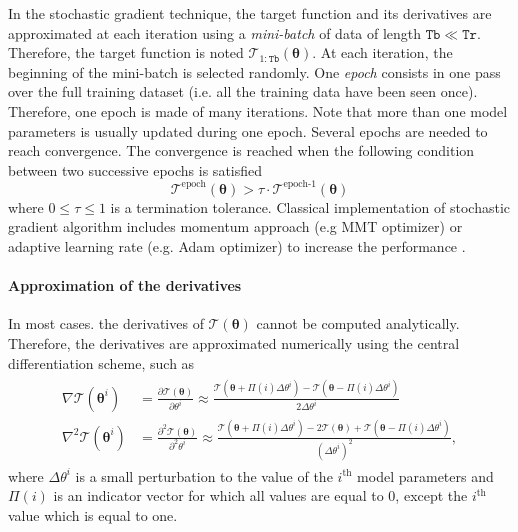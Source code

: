 In the stochastic gradient technique, the target function and its derivatives are approximated at each iteration using a \emph{mini-batch} of data of length $\mathtt{Tb} \ll \mathtt{Tr}$.
Therefore, the target function is noted $\mathcal{T}_{1:\mathtt{Tb}}(\bm{\theta})$.
At each iteration, the beginning of the mini-batch is selected randomly.
One \emph{epoch} consists in one pass over the full training dataset (i.e. all the training data have been seen once).
Therefore, one epoch is made of many iterations.
Note that more than one model parameters is usually updated during one epoch.
Several epochs are needed to reach convergence.
The convergence is reached when the following condition between two successive epochs is satisfied 
\begin{equation}
\mathcal{T}^{\text{epoch}} (\bm\theta) > \tau  \cdot \mathcal{T}^{\text{epoch-1}} (\bm\theta)
\label{EQ:SGT}
\end{equation}
where $0 \le \tau \le 1$ is a termination tolerance.
Classical implementation of stochastic gradient algorithm includes momentum approach (e.g MMT optimizer) or adaptive learning rate (e.g. Adam optimizer) to increase the performance \cite{Goodfellow-et-al-2016}.  

\paragraph{Approximation of the derivatives}

In most cases. the derivatives of $\mathcal{T}(\bm{\theta})$ cannot be computed analytically.
Therefore, the derivatives are approximated numerically using the central differentiation scheme, such as
\begin{gather}
\begin{aligned}
 \nabla \mathcal{T}(\bm\theta^{i}) & = \frac{\partial \mathcal{T} (\bm\theta) }{\partial \theta^{i}} \approx \frac{\mathcal{T} (\bm\theta + \Pi(i)\Delta \theta^{i} )  -  \mathcal{T} (\bm\theta - \Pi(i)\Delta \theta^{i} ) }{2\Delta \theta^{i}}  \\
 \nabla^{2} \mathcal{T}(\bm\theta^{i}) & = \frac{\partial^{2} \mathcal{T} (\bm\theta) }{\partial^{2} \theta^{i}} \approx \frac{\mathcal{T} (\bm\theta + \Pi(i)\Delta \theta^{i} )  -  2 \mathcal{T} (\bm\theta) +  \mathcal{T} (\bm\theta - \Pi(i)\Delta \theta^{i} ) }{(\Delta \theta^{i})^{2}},
\label{EQ:numericaldiff}
\end{aligned}
\end{gather}
where $\Delta \theta^{i}$ is a small perturbation to the value of the $i^{\text{th}}$ model parameters and $\Pi(i)$ is an indicator vector for which all values are equal to $0$, except the $i^{\text{th}}$ value which is equal to one.


